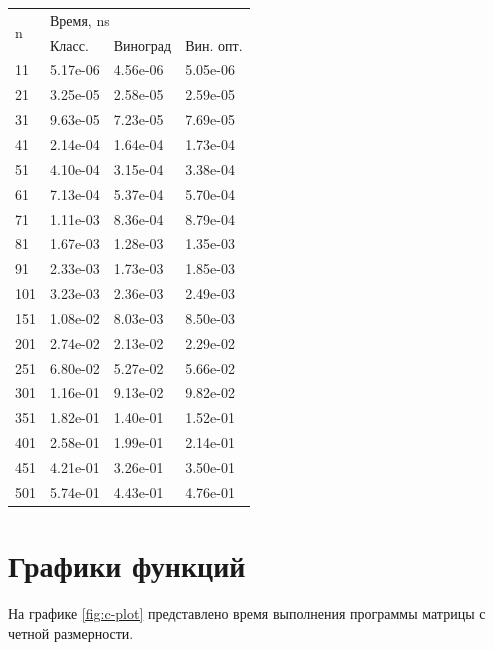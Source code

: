 \begin{table}[ht!]
\begin{subtable}[ht!]{0.45\textwidth}
		\begin{tabular}{||l|l|l|l||}
			\hline
			\multirow{2}{*}{n} & \multicolumn{3}{l|}{Время, ns} \\ \cline{2-4} 
			&  Класс. & Виноград & Вин. опт. \\ \hline\hline
			11 & 5.17e-06 & 4.56e-06 & 5.05e-06 \\ \hline 
			21 & 3.25e-05 & 2.58e-05 & 2.59e-05 \\ \hline 
			31 & 9.63e-05 & 7.23e-05 & 7.69e-05 \\ \hline 
			41 & 2.14e-04 & 1.64e-04 & 1.73e-04 \\ \hline 
			51 & 4.10e-04 & 3.15e-04 & 3.38e-04 \\ \hline 
			61 & 7.13e-04 & 5.37e-04 & 5.70e-04 \\ \hline 
			71 & 1.11e-03 & 8.36e-04 & 8.79e-04 \\ \hline 
			81 & 1.67e-03 & 1.28e-03 & 1.35e-03 \\ \hline 
			91 & 2.33e-03 & 1.73e-03 & 1.85e-03 \\ \hline 
			101 & 3.23e-03 & 2.36e-03 & 2.49e-03 \\ \hline 
			151 & 1.08e-02 & 8.03e-03 & 8.50e-03 \\ \hline 
			201 & 2.74e-02 & 2.13e-02 & 2.29e-02 \\ \hline 
			251 & 6.80e-02 & 5.27e-02 & 5.66e-02 \\ \hline 
			301 & 1.16e-01 & 9.13e-02 & 9.82e-02 \\ \hline 
			351 & 1.82e-01 & 1.40e-01 & 1.52e-01 \\ \hline 
			401 & 2.58e-01 & 1.99e-01 & 2.14e-01 \\ \hline 
			451 & 4.21e-01 & 3.26e-01 & 3.50e-01 \\ \hline 
			501 & 5.74e-01 & 4.43e-01 & 4.76e-01 \\ \hline 
		\end{tabular}
		\label{tab:even}
	\end{subtable}
	\label{tab:time}
\end{table} 

\newpage

\section{Графики функций}


На графике \ref{fig:c-plot} представлено время выполнения программы матрицы с четной размерности.


